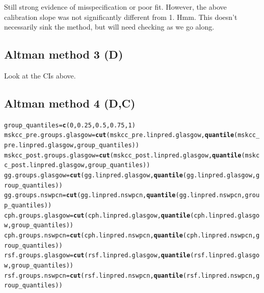 \documentclass{article}\usepackage[]{graphicx}\usepackage[]{color}
\makeatletter
\newcommand{\hlnum}[1]{\textcolor[rgb]{0.686,0.059,0.569}{#1}}%
\newcommand{\hlstd}[1]{\textcolor[rgb]{0.345,0.345,0.345}{#1}}%
\newcommand{\hlkwb}[1]{\textcolor[rgb]{0.69,0.353,0.396}{#1}}%
\newcommand{\hlkwd}[1]{\textcolor[rgb]{0.737,0.353,0.396}{\textbf{#1}}}%
\newenvironment{kframe}{%
 \def\at@end@of@kframe{}%
 \ifinner\ifhmode%
  \def\at@end@of@kframe{\end{minipage}}%
  \begin{minipage}{\columnwidth}%
 \fi\fi%
 \def\FrameCommand##1{\hskip\@totalleftmargin \hskip-\fboxsep
 \colorbox{shadecolor}{##1}\hskip-\fboxsep
     \hskip-\linewidth \hskip-\@totalleftmargin \hskip\columnwidth}%
 \MakeFramed {\advance\hsize-\width
   \@totalleftmargin\z@ \linewidth\hsize
   \@setminipage}}%
 {\par\unskip\endMakeFramed%
 \at@end@of@kframe}
\newenvironment{knitrout}{}{} %
\makeatother
\begin{document}
Still strong evidence of misspecification or poor fit.  However, the above calibration slope was not significantly different from 1.  Hmm.  This doesn't necessarily sink the method, but will need checking as we go along.

\subsection{Altman method 3 (D)}
Look at the CIs above.

\subsection{Altman method 4 (D,C)}
\begin{knitrout}
\color{fgcolor}\begin{kframe}
\begin{alltt}
\hlstd{group_quantiles} \hlkwb{=} \hlkwd{c}\hlstd{(}\hlnum{0}\hlstd{,} \hlnum{0.25}\hlstd{,} \hlnum{0.5}\hlstd{,} \hlnum{0.75}\hlstd{,} \hlnum{1}\hlstd{)}
\hlstd{mskcc_pre.groups.glasgow} \hlkwb{=} \hlkwd{cut}\hlstd{(mskcc_pre.linpred.glasgow,} \hlkwd{quantile}\hlstd{(mskcc_pre.linpred.glasgow, group_quantiles))}
\hlstd{mskcc_post.groups.glasgow} \hlkwb{=} \hlkwd{cut}\hlstd{(mskcc_post.linpred.glasgow,} \hlkwd{quantile}\hlstd{(mskcc_post.linpred.glasgow, group_quantiles))}
\hlstd{gg.groups.glasgow} \hlkwb{=} \hlkwd{cut}\hlstd{(gg.linpred.glasgow,} \hlkwd{quantile}\hlstd{(gg.linpred.glasgow, group_quantiles))}
\hlstd{gg.groups.nswpcn} \hlkwb{=} \hlkwd{cut}\hlstd{(gg.linpred.nswpcn,} \hlkwd{quantile}\hlstd{(gg.linpred.nswpcn, group_quantiles))}
\hlstd{cph.groups.glasgow} \hlkwb{=} \hlkwd{cut}\hlstd{(cph.linpred.glasgow,} \hlkwd{quantile}\hlstd{(cph.linpred.glasgow, group_quantiles))}
\hlstd{cph.groups.nswpcn} \hlkwb{=} \hlkwd{cut}\hlstd{(cph.linpred.nswpcn,} \hlkwd{quantile}\hlstd{(cph.linpred.nswpcn, group_quantiles))}
\hlstd{rsf.groups.glasgow} \hlkwb{=} \hlkwd{cut}\hlstd{(rsf.linpred.glasgow,} \hlkwd{quantile}\hlstd{(rsf.linpred.glasgow, group_quantiles))}
\hlstd{rsf.groups.nswpcn} \hlkwb{=} \hlkwd{cut}\hlstd{(rsf.linpred.nswpcn,} \hlkwd{quantile}\hlstd{(rsf.linpred.nswpcn, group_quantiles))}


\end{alltt}
\end{kframe}
\end{knitrout}
\end{document}
